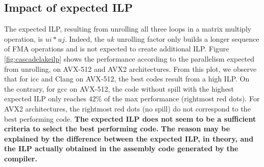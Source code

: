 \documentclass{article}
\begin{document}
\subsection{Impact of expected ILP}
The expected ILP, resulting from unrolling all three loops in a matrix multiply operation, is $ui * uj$. Indeed, the $uk$ unrolling factor only builds a longer sequence of FMA operations and is not expected to create additional ILP.
Figure \ref{fig:cascadelakeilp} shows the performance according to the parallelism expected from unrolling, on AVX-512 and AVX2 architectures. From this plot, we observe that for icc and Clang on AVX-512, the best codes result from a high ILP. On the contrary, for gcc on AVX-512, the code without spill with the highest expected ILP only reaches $42\%$ of the max performance (rightmost red dots). For AVX2 architectures, the rightmost red dots (no spill) do not correspond to the best performing code.
\textbf{The expected ILP does not seem to be a sufficient criteria to select the best performing code.}
\textbf{The reason  may be explained by the difference between the expected ILP, in theory, and the ILP actually obtained in the assembly code generated by the compiler.}
\end{document}
